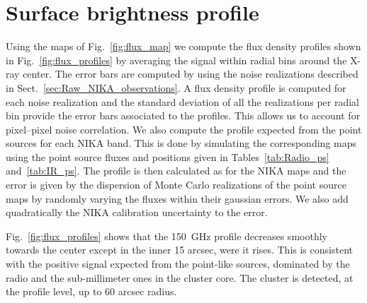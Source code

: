 \documentclass[twocolumn,traditabstract]{aa}
\begin{document}
\section{Surface brightness profile}\label{sec:surface_brightness_profiles_comparison}
Using the maps of Fig.~\ref{fig:flux_map} we compute the flux density profiles shown in Fig.~\ref{fig:flux_profiles} by averaging the signal within radial bins around the X-ray center. The error bars are computed by using the noise realizations described in Sect.~\ref{sec:Raw_NIKA_observations}. A flux density profile is computed for each noise realization and the standard deviation of all the realizations per radial bin provide the error bars associated to the profiles. This allows us to account for pixel--pixel noise correlation. We also compute the profile expected from the point sources for each NIKA band. This is done by simulating the corresponding maps using the point source fluxes and positions given in Tables~\ref{tab:Radio_ps} and~\ref{tab:IR_ps}. The profile is then calculated as for the NIKA maps and the error is given by the dispersion of Monte Carlo realizations of the point source maps by randomly varying the fluxes within their gaussian errors. We also add quadratically the NIKA calibration uncertainty to the error.

Fig.~\ref{fig:flux_profiles} shows that the 150~GHz profile decreases smoothly towards the center except in the inner 15 arcsec, were it rises. This is consistent with the positive signal expected from the point-like sources, dominated by the radio and the sub-millimeter ones in the cluster core. The cluster is detected, at the profile level, up to 60 arcsec radius. 
\end{document}
